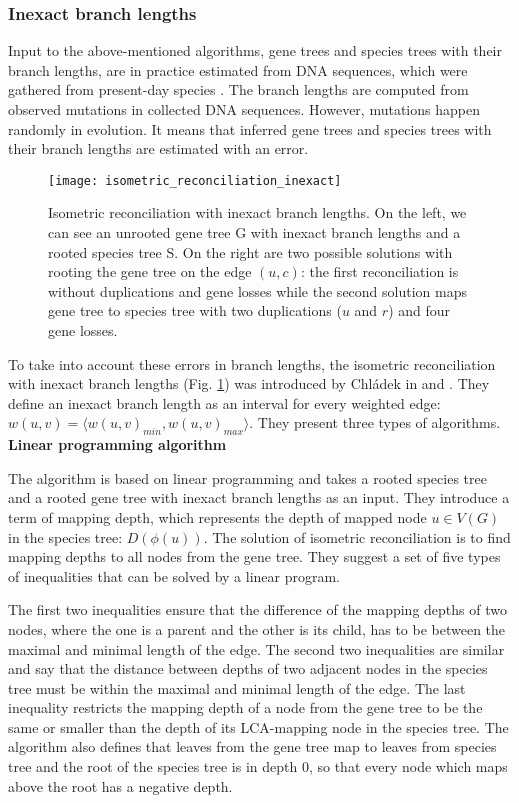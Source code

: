 \subsubsection{Inexact branch lengths} \label{Inexact_branch_lengths}
Input to the above-mentioned algorithms, gene trees and species trees with their branch lengths, are in practice estimated from DNA sequences, which were gathered from present-day species \cite{felsenstein}. The branch lengths are computed from observed mutations in collected DNA sequences. However, mutations happen randomly in evolution. It means that inferred gene trees and species trees with their branch lengths are estimated with an error.

\begin{figure}[ht!]
	\centering
	\label{isometric_reconciliation_inexact}
  	\texttt{[image: isometric\_reconciliation\_inexact]}
  	\caption[Isometric reconciliation with inexact branch lengths]{Isometric reconciliation with inexact branch lengths. On the left, we can see an unrooted gene tree G with inexact branch lengths and a rooted species tree S. On the right are two possible solutions with rooting the gene tree on the edge $(u, c)$: the first reconciliation is without duplications and gene losses while the second solution maps gene tree to species tree with two duplications ($u$ and $r$) and four gene losses.}
\end{figure}

To take into account these errors in branch lengths, the isometric reconciliation with inexact branch lengths (Fig. \ref{isometric_reconciliation_inexact}) was introduced by Chládek in \cite{chladek_unpublished} and \cite{chladek_thesis}. They define an inexact branch length as an interval for every weighted edge: $w(u, v) = \langle w(u, v)_{min}, w(u, v)_{max} \rangle$. They present three types of algorithms.\\
\textbf{Linear programming algorithm}

The algorithm is based on linear programming and takes a rooted species tree and a rooted gene tree with inexact branch lengths as an input. They introduce a term of mapping depth, which represents the depth of mapped node $u \in V(G)$ in the species tree: $D(\phi(u))$. The solution of isometric reconciliation is to find mapping depths to all nodes from the gene tree. They suggest a set of five types of inequalities that can be solved by a linear program.

The first two inequalities ensure that the difference of the mapping depths of two nodes, where the one is a parent and the other is its child, has to be between the maximal and minimal length of the edge. The second two inequalities are similar and say that the distance between depths of two adjacent nodes in the species tree must be within the maximal and minimal length of the edge. The last inequality restricts the mapping depth of a node from the gene tree to be the same or smaller than the depth of its LCA-mapping node in the species tree. The algorithm also defines that leaves from the gene tree map to leaves from species tree and the root of the species tree is in depth 0, so that every node which maps above the root has a negative depth. 

